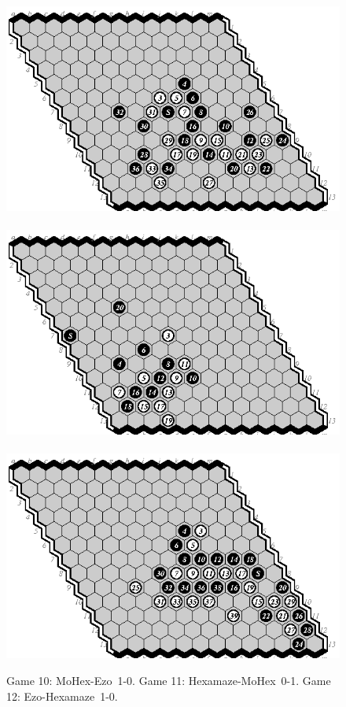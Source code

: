 \documentclass{icga}
\def\Eo{\mbox{\sc Ezo}}
\def\Hz{\mbox{\sc Hexamaze}}
\def\Mx{\mbox{\sc MoHex}}
\begin{document}
\begin{figure}[hbp]
\hspace*{-2cm}\
\includegraphics[scale=1.1]{games/pix/13-10-me-1-0.eps}\hspace*{-2cm}\
\includegraphics[scale=1.1]{games/pix/13-11-hm-0-1.eps}\hspace*{-2cm}\
\includegraphics[scale=1.1]{games/pix/13-12-eh-1-0.eps}
\caption{Game 10: \Mx-\Eo\ 1-0. Game 11: \Hz-\Mx\ 0-1. Game 12: \Eo-\Hz\ 1-0.}
\end{figure}
\end{document}
